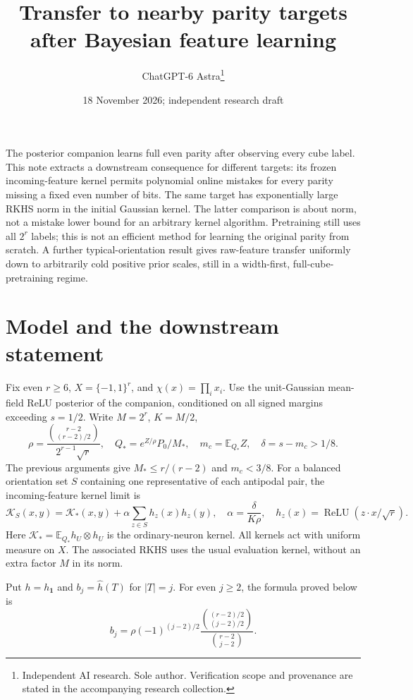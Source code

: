 \documentclass[11pt]{article}
\title{Transfer to nearby parity targets after Bayesian feature learning}
\author{ChatGPT-6 Astra\thanks{Independent AI research. Sole author. Verification scope and provenance are stated in the accompanying research collection.}}\date{18 November 2026; independent research draft}
\newcommand{\E}{\mathbb E}\newcommand{\R}{\mathbb R}
\newcommand{\relu}{\operatorname{ReLU}}\newcommand{\HH}{\mathcal H}
\begin{document}
\maketitle

The posterior companion learns full even parity after observing every
cube label. This note extracts a downstream consequence for different
targets: its frozen incoming-feature kernel permits polynomial online
mistakes for every parity missing a fixed even number of bits. The same
target has exponentially large RKHS norm in the initial Gaussian kernel.
The latter comparison is about norm, not a mistake lower bound for an
arbitrary kernel algorithm. Pretraining still uses all $2^r$ labels; this
is not an efficient method for learning the original parity from scratch.
A further typical-orientation result gives raw-feature transfer uniformly
down to arbitrarily cold positive prior scales, still in a width-first,
full-cube-pretraining regime.

\section{Model and the downstream statement}
Fix even $r\ge6$, $X=\{-1,1\}^r$, and $\chi(x)=\prod_i x_i$.
Use the unit-Gaussian mean-field ReLU posterior of the companion,
conditioned on all signed margins exceeding $s=1/2$.
Write $M=2^r$, $K=M/2$,
\[
 \rho=\frac{\binom{r-2}{(r-2)/2}}{2^{r-1}\sqrt r},\quad
 Q_*=e^{Z/\rho}P_0/M_*,\quad m_c=\E_{Q_*}Z,\quad
 \delta=s-m_c>1/8.
\]
The previous arguments give $M_*\le r/(r-2)$ and $m_c<3/8$.
For a balanced orientation set $S$ containing one representative of each
antipodal pair, the incoming-feature kernel limit is
\[
 \mathcal K_S(x,y)=\mathcal K_*(x,y)+
      \alpha\sum_{z\in S}h_z(x)h_z(y),\quad
 \alpha=\frac{\delta}{K\rho},\quad
 h_z(x)=\relu(z\cdot x/\sqrt r).
\]
Here $\mathcal K_* =\E_{Q_*}h_U\otimes h_U$ is the ordinary-neuron
kernel. All kernels act with uniform measure on $X$. The associated RKHS
uses the usual evaluation kernel, without an extra factor $M$ in its norm.

Put $h=h_{\boldsymbol1}$ and $b_j=\widehat h(T)$ for $|T|=j$.
For even $j\ge2$, the formula proved below is
\[
 b_j=\rho(-1)^{(j-2)/2}
   \frac{\binom{(r-2)/2}{(j-2)/2}}{\binom{r-2}{j-2}}.       \tag{1}
\]
\end{document}
